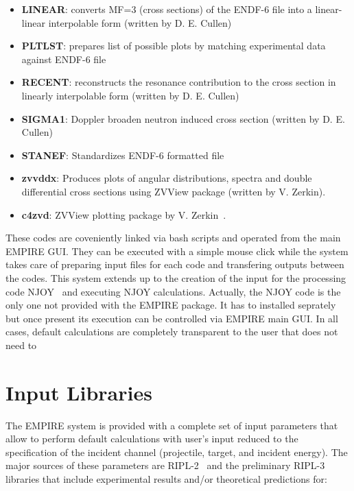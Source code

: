 \begin{itemize}
\item \textbf{LINEAR}: converts MF=3 (cross sections) of the ENDF-6 file
into a linear-linear interpolable form (written by D. E. Cullen)~\cite%
{PREPRO}

\item \textbf{PLTLST}: prepares list of possible plots by matching
experimental data against ENDF-6 file

\item \textbf{RECENT}: reconstructs the resonance contribution to the cross
section in linearly interpolable form (written by D. E. Cullen)~\cite{PREPRO}

\item \textbf{SIGMA1}: Doppler broaden neutron induced cross section
(written by D. E. Cullen)~\cite{PREPRO}

\item \textbf{STANEF}: Standardizes ENDF-6 formatted file

\item \textbf{zvvddx}: Produces plots of angular distributions, spectra and
double differential cross sections using ZVView package (written by V.
Zerkin).

\item \textbf{c4zvd}: ZVView\textbf{%
} plotting package by V. Zerkin~\cite{ZVView}.
\end{itemize}

These codes are coveniently linked via bash scripts and operated from the
main EMPIRE GUI. They can be executed with a simple mouse click while the
system takes care of preparing input files for each code and transfering
outputs between the codes. This system extends up to the creation of the
input for the processing code NJOY~\cite{NJOY} and executing NJOY
calculations. Actually, the NJOY code is the only one not provided with the
EMPIRE package. It has to installed seprately but once present its execution
can be controlled via EMPIRE main GUI. In all cases, default calculations
are completely transparent to the user that does not need to

\section{Input Libraries}

The EMPIRE system is provided with a complete set of input parameters that
allow to perform default calculations with user's input reduced to the
specification of the incident channel (projectile, target, and incident
energy). The major sources of these parameters are RIPL-2~\cite{RIPL-2} and
the preliminary RIPL-3 libraries that include experimental results and/or
theoretical predictions for:

